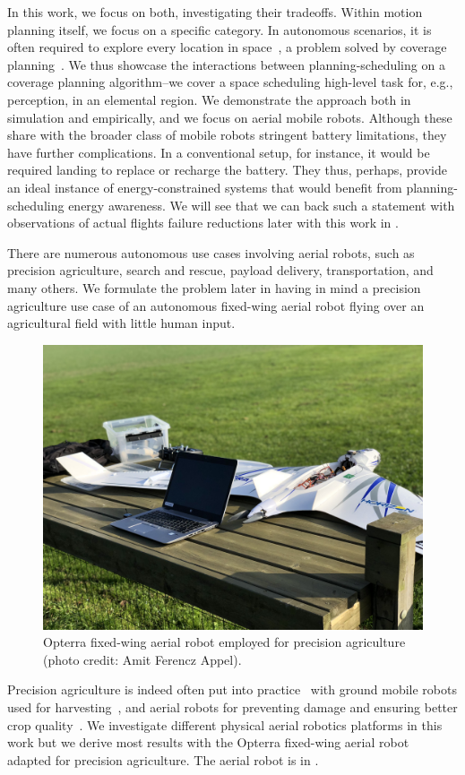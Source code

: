 In this work, we focus on both, investigating their tradeoffs. Within motion planning itself, we focus on a specific category. In autonomous scenarios, it is often required to explore every location in space~\citep{cao1988region}, a problem solved by coverage planning~\citep{choset2001coverage}. We thus showcase the interactions between planning-scheduling on a coverage planning algorithm--we cover a space scheduling high-level task for, e.g., perception, in an elemental region. We demonstrate the approach both in simulation and empirically, and we focus on aerial mobile robots. Although these share with the broader class of mobile robots stringent battery limitations, they have further complications. In a conventional setup, for instance, it would be required landing to replace or recharge the battery. They thus, perhaps, provide an ideal instance of energy-constrained systems that would benefit from planning-scheduling energy awareness. We will see that we can back such a statement with observations of actual flights failure reductions later with this work in .

There are numerous autonomous use cases involving aerial robots, such as precision agriculture, search and rescue, payload delivery, transportation, and many others. We formulate the problem later in  having in mind a precision agriculture use case of an autonomous fixed-wing aerial robot flying over an agricultural field with little human input.
\begin{figure}[t]
  \centering
  \includegraphics[width=.7\textwidth]{pictures/photo}
  \caption[Opterra fixed-wing aerial robot]{Opterra fixed-wing aerial robot employed for precision agriculture {\scriptsize(photo credit: Amit Ferencz Appel)}.}
  \label{fig:opterra}
\end{figure}
Precision agriculture is indeed often put into practice~\citep{hajjaj2014review} with ground mobile robots used for harvesting~\citep{qingchun2012study,dong2011development, de2011design, aljanobi2010setup, li2008analysis, edan2000robotic}, and aerial robots for preventing damage and ensuring better crop quality~\citep{puri2017agriculture, daponte2019review}. We investigate different physical aerial robotics platforms in this work but we derive most results with the Opterra fixed-wing aerial robot~\citep{opterra} adapted for precision agriculture. The aerial robot is in .

